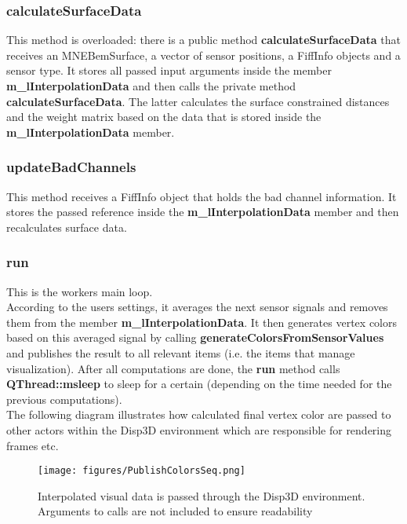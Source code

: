 \subsubsection{calculateSurfaceData}

This method is overloaded: there is a public method \textbf{calculateSurfaceData} that receives an MNEBemSurface, a vector of sensor positions, a FiffInfo objects and a sensor type. It stores all passed input arguments inside the member \textbf{m\_lInterpolationData} and then calls the private method \textbf{calculateSurfaceData}. The latter calculates the surface constrained distances and the weight matrix based on the data that is stored inside the \textbf{m\_lInterpolationData} member. 

\subsubsection{updateBadChannels}

This method receives a FiffInfo object that holds the bad channel information. It stores the passed reference inside the \textbf{m\_lInterpolationData} member and then recalculates surface data.

\subsubsection{run}

This is the workers main loop.\\
According to the users settings, it averages the next sensor signals and removes them from the member \textbf{m\_lInterpolationData}. It then generates vertex colors based on this averaged signal by calling \textbf{generateColorsFromSensorValues} and publishes the result to all relevant items (i.e. the items that manage visualization). After all computations are done, the \textbf{run} method calls \textbf{QThread::msleep} to sleep for a certain (depending on the time needed for the previous computations).\\
The following diagram illustrates how calculated final vertex color are passed to other actors within the Disp3D environment which are responsible for rendering frames etc.

\begin{figure}[h]
	\begin{center}
		\texttt{[image: figures/PublishColorsSeq.png]}
		\caption{Interpolated visual data is passed through the Disp3D environment. Arguments to calls are not included to ensure readability}
	\end{center}
\end{figure}

